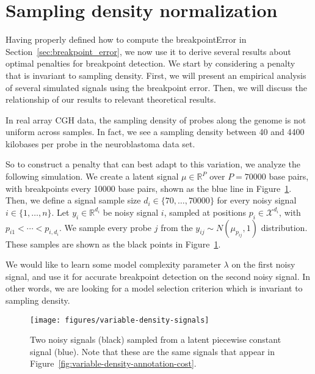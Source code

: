 \documentclass{jsfds} %
\newcommand{\RR}{\mathbb{R}}
\begin{document}
\newpage

\section{Sampling density normalization}
\label{variable_density}
Having properly defined how to compute the breakpointError in
Section~\ref{sec:breakpoint_error}, we now use it to derive several
results about optimal penalties for breakpoint detection. We start by
considering a penalty that is invariant to sampling density. First, we
will present an empirical analysis of several simulated signals using
the breakpoint error. Then, we will discuss the relationship of our
results to relevant theoretical results.

In real array CGH data, the sampling density of probes along the
genome is not uniform across samples. In fact, we see a sampling
density between 40 and 4400 kilobases per probe in the neuroblastoma
data set.

So to construct a penalty that can best adapt to this variation, we
analyze the following simulation. We create a latent signal
$\mu\in\RR^P$ over $P=70000$ base pairs, with breakpoints every 10000
base pairs, shown as the blue line in
Figure~\ref{fig:variable-density-signals}. Then, we define a signal
sample size $d_i\in\{70,\dots,70000\}$ for every noisy signal
$i\in\{1,\dots,n\}$. Let $y_i\in\RR^{d_i}$ be noisy signal $i$,
sampled at positions $p_i\in\mathcal X^{d_i}$, with
$p_{i1}<\cdots<p_{i,d_i}$. We sample every probe $j$ from the
$y_{ij}\sim N(\mu_{p_{ij}},1)$ distribution. These samples are shown
as the black points in Figure~\ref{fig:variable-density-signals}.

We would like to learn some model complexity parameter $\lambda$ on
the first noisy signal, and use it for accurate breakpoint detection
on the second noisy signal. In other words, we are looking for a model
selection criterion which is invariant to sampling density. 

\begin{figure}[H]
\texttt{[image: figures/variable-density-signals]}
%
\vskip -0.3cm
  \caption{Two noisy signals (black) sampled from
  a latent piecewise constant signal (blue). Note that these are the
  same signals that appear in
  Figure~\ref{fig:variable-density-annotation-cost}.}
\label{fig:variable-density-signals}
\end{figure}

\newpage
\end{document}
